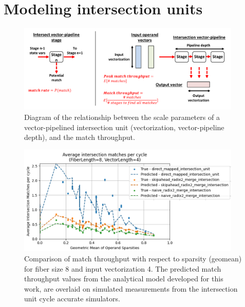 \section{Modeling intersection units}

\begin{figure}[ht]
    \centering
    \includegraphics[width=0.95\textwidth]{figures/isect_model.pdf}
    \caption{Diagram of the relationship between the scale parameters of a vector-pipelined intersection unit (vectorization, vector-pipeline depth), and the match throughput.}
    \label{fig:isect_model}
\end{figure}

\begin{figure}[ht]
    \centering
    \includegraphics[width=0.95\textwidth]{figures/isect_model_fl8_vl4.pdf}
    \caption{Comparison of match throughput with respect to sparsity (geomean) for fiber size 8 and input vectorization 4. The predicted match throughput values from the analytical model developed for this work, are overlaid on simulated measurements from the intersection unit cycle accurate simulators.}
    \label{fig:isect_model_fl8_vl4}
\end{figure}